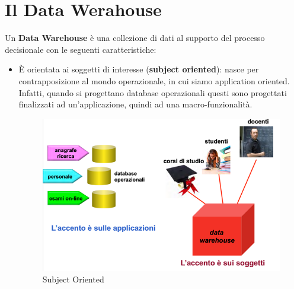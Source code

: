 	\section{Il Data Werahouse}
Un \textbf{Data Warehouse} è una collezione di dati al supporto del processo decisionale con le seguenti caratteristiche:
\begin{itemize}
	\item
	È orientata ai soggetti di interesse (\textbf{subject oriented}): nasce per contrapposizione al mondo operazionale, in cui siamo application oriented. Infatti, quando si progettano database operazionali questi sono progettati finalizzati ad un’applicazione, quindi ad una macro-funzionalità. 
	\begin{figure}[H]
		\centering
		\includegraphics[width=0.7\linewidth]{img/SubjO}
		\caption{Subject Oriented}
		\label{fig:subjor}
	\end{figure}
	

\end{itemize}
